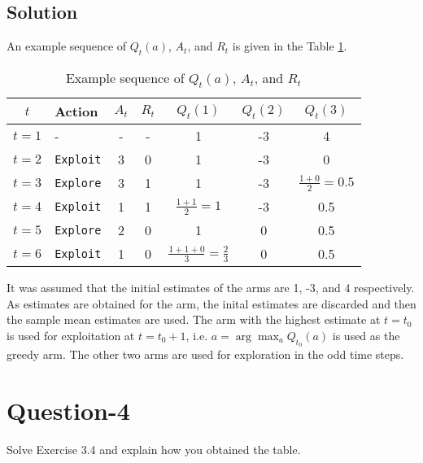 \documentclass[11pt]{article}
\begin{document}
    \subsection*{Solution}
    An example sequence of $Q_{t}(a)$, $A_{t}$, and $R_{t}$ is given in the Table \ref{tab:example}.
    \begin{table}[ht]
        \centering
        \renewcommand{\arraystretch}{1.5}
        \begin{tabular}{cl|cc|ccc}
            $t$ & \textbf{Action} & $A_{t}$ & $R_{t}$ & $Q_{t}(1)$ & $Q_{t}(2)$ & $Q_{t}(3)$ \\
            \hline
            $t = 1$ & - & - & - & 1 & -3 & 4 \\
            $t = 2$ & \texttt{Exploit} & 3 & 0 & 1 & -3 & 0 \\
            $t = 3$ & \texttt{Explore} & 3 & 1 & 1 & -3 & $\frac{1+0}{2} = 0.5$ \\
            $t = 4$ & \texttt{Exploit} & 1 & 1 & $\frac{1+1}{2} = 1$ & -3 & 0.5 \\
            $t = 5$ & \texttt{Explore} & 2 & 0 & 1 & 0 & 0.5 \\
            $t = 6$ & \texttt{Exploit} & 1 & 0 & $\frac{1+1+0}{3} = \frac{2}{3}$ & 0 & 0.5 \\
        \end{tabular}
        \caption{Example sequence of $Q_{t}(a)$, $A_{t}$, and $R_{t}$}
        \label{tab:example}
    \end{table}
    It was assumed that the initial estimates of the arms are 1, -3, and 4 respectively. As estimates
    are obtained for the arm, the inital estimates are discarded and then the sample mean estimates
    are used. The arm with the highest estimate at $t = t_{0}$ is used for exploitation at $t = t_{0}+1$,
    i.e. $a = \arg\max_{a} Q_{t_{0}}(a)$ is used as the greedy arm. The other two arms are used for
    exploration in the odd time steps.

    \section*{Question-4}
    Solve Exercise 3.4 and explain how you obtained the table.
\end{document}
